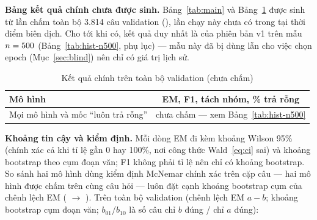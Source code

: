 \else
\begin{keybox}
\textbf{Bảng kết quả chính chưa được sinh.} Bảng~\ref{tab:main} và Bảng~\ref{tab:ans-imp} được
sinh từ lần chấm toàn bộ 3.814 câu validation (), lần chạy này chưa có
trong  tại thời điểm biên dịch. Cho tới khi có, kết quả duy nhất là của phiên bản
v1 trên mẫu $n = 500$ (Bảng~\ref{tab:hist-n500}, phụ lục) --- mẫu này đã bị dùng lẫn cho việc
chọn epoch (Mục~\ref{sec:blind}) nên chỉ có giá trị lịch sử.
\end{keybox}

\begin{table}[htbp]
\centering
\caption{Kết quả chính trên toàn bộ validation (chưa chấm)}
\label{tab:main}\label{tab:ans-imp}
\small
\begin{tabular}{@{}l c@{}}
\toprule
\textbf{Mô hình} & \textbf{EM, F1, tách nhóm, \% trả rỗng} \\
\midrule
Mọi mô hình và mốc ``luôn trả rỗng'' & chưa chấm --- xem Bảng~\ref{tab:hist-n500} \\
\bottomrule
\end{tabular}
\end{table}
\fi

\noindent\textbf{Khoảng tin cậy và kiểm định.} Mỗi dòng EM đi kèm khoảng Wilson 95\% (chính xác cả
khi tỉ lệ gần 0 hay 100\%, nơi công thức Wald~\eqref{eq:ci} sai) và khoảng bootstrap theo cụm đoạn
văn; F1 không phải tỉ lệ nên chỉ có khoảng bootstrap. So sánh hai mô hình dùng kiểm định McNemar
chính xác trên cặp câu --- hai mô hình được chấm trên cùng câu hỏi --- luôn đặt cạnh khoảng
bootstrap cụm của chênh lệch EM ( $\to$
).
\ifhasFullEval\ifhasStats
Trên toàn bộ validation (chênh lệch EM $a - b$; khoảng bootstrap cụm đoạn văn; $b_{01}$/$b_{10}$ là
số câu chỉ $b$ đúng / chỉ $a$ đúng):

